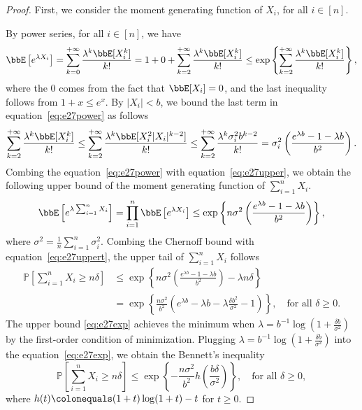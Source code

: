 \documentclass[11pt]{article}
\theoremstyle{plain}
\theoremstyle{definition}
\begin{document}
\begin{proof}
	First, we consider the moment generating function of $X_i$, for all $i \in [n]$.
	
	\vspace{0.2cm}
	By power series, for all $i \in [n]$, we have
	\begin{align}\label{eq:e27power}
		\bbE\left[e^{\lambda X_i}\right] = \sum_{k = 0}^{+\infty} \frac{\lambda^k \bbE[X_i^k]}{k!} 
		= 1 + 0 + \sum_{k = 2}^{+\infty} \frac{\lambda^k \bbE[X_i^k]}{k!} \leq \exp\left\{ \sum_{k = 2}^{+\infty} \frac{\lambda^k \bbE[X_i^k]}{k!} \right\},
	\end{align}
	where the 0 comes from the fact that $\bbE[X_i] = 0$, and the last inequality follows from $1 + x \leq e^x$. By $|X_i|<b$, we bound the last term in equation~\eqref{eq:e27power} as follows
	\begin{equation}\label{eq:e27upper}
		\sum_{k = 2}^{+\infty} \frac{\lambda^k \bbE[X_i^k]}{k!}  \leq \sum_{k = 2}^{+\infty} \frac{\lambda^k \bbE[X_i^2 |X_i|^{k-2}] }{k!} \leq  \sum_{k = 2}^{+\infty} \frac{\lambda^k \sigma^2_i b^{k-2}}{k!} = \sigma_i^2  \left(  \frac{e^{\lambda b} - 1 -\lambda b}{b^2}   \right).
	\end{equation}
	Combing the equation~\eqref{eq:e27power} with equation~\eqref{eq:e27upper}, we obtain the following upper bound of the moment generating function of $\sum_{i=1}^n X_i$.
	\begin{equation}\label{eq:e27uppert}
		\bbE\left[e^{\lambda \sum_{i = 1}^n X_i }\right] = \prod_{i = 1}^n \bbE\left[e^{\lambda X_i}\right] \leq \exp\left\{ n \sigma^2 \left( \frac{e^{\lambda b} - 1 -\lambda b}{b^2}   \right)  \right\},
	\end{equation}
	where $\sigma^2 = \frac{1}{n} \sum_{i=1}^n \sigma_i^2$. Combing the Chernoff bound with equation~\eqref{eq:e27uppert}, the upper tail of $\sum_{i=1}^n X_i$ follows 
	\begin{align}
		\mathbb{P}\left[\sum_{i=1}^{n} X_{i} \geq n \delta\right] &\leq  \exp\left\{  n \sigma^2 \left(  \frac{e^{\lambda b} - 1 -\lambda b}{b^2}   \right)  - 
		\lambda n \delta \right\} \\
		&= \exp \left\{ \frac{n\sigma^2}{b^2} \left( e^{\lambda b} - \lambda b- \lambda \frac{\delta b^2}{\sigma^2} - 1 \right)  \right\}, \quad \text{for all } \delta \geq 0. \label{eq:e27exp}
	\end{align} 
	The upper bound \eqref{eq:e27exp} achieves the minimum when $\lambda = b^{-1}\log\left(1 + \frac{\delta b}{\sigma^2} \right)$ by the first-order condition of minimization. Plugging $\lambda =b^{-1} \log\left(1 + \frac{\delta b}{\sigma^2} \right)$ into the equation~\eqref{eq:e27exp}, we obtain the Bennett's inequality 
	\begin{equation}\label{eq:e27bennett}
		\mathbb{P}\left[\sum_{i=1}^{n} X_{i} \geq n \delta\right] \leq  \exp \left\{-\frac{n \sigma^{2}}{b^{2}} h\left(\frac{b \delta}{\sigma^{2}}\right)\right\}, \quad \text{for all }\delta \geq 0,
	\end{equation}
	where $h(t) \colonequals (1+t)\log (1+t) - t$ for $t \geq 0$.
	

\end{proof}
\end{document}
